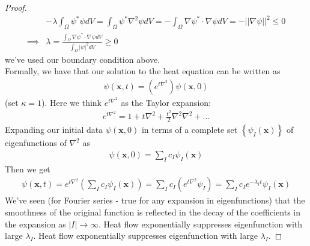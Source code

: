 \documentclass[a4paper]{article}
\begin{document}
\begin{proof}
\begin{equation*}
\begin{aligned}
&-\lambda \int_\Omega \psi^* \psi dV = \int_\Omega \psi^* \nabla^2 \psi dV = -\int_\Omega \nabla\psi^* \cdot \nabla\psi dV = - ||\nabla\psi||^2 \leq 0\\
\implies & \lambda = \frac{\int_\Omega \nabla \psi^* \cdot \nabla \psi dV}{\int_\Omega \left|\psi\right|^2 dV} \geq 0
\end{aligned}
\end{equation*}
we've used our boundary condition above.\\
Formally, we have that our solution to the heat equation can be written as
\begin{equation*}
\begin{aligned}
\psi\left(\mathbf{x},t\right) = \left(e^{t\nabla^2}\right)\psi\left(\mathbf{x},0\right)
\end{aligned}
\end{equation*}
(set $\kappa = 1$). Here we think $e^{t\nabla^2}$ as the Taylor expansion:
\begin{equation*}
\begin{aligned}
e^{t\nabla^2} = 1+t\nabla^2 + \frac{t^2}{2} \nabla^2\nabla^2+...
\end{aligned}
\end{equation*}
Expanding our initial data $\psi\left(\mathbf{x},0\right)$ in terms of a complete set $\left\{\psi_I\left(\mathbf{x}\right)\right\}$ of eigenfunctions of $\nabla^2$ as 
\begin{equation*}
\begin{aligned}
\psi\left(\mathbf{x},0\right) = \sum_I c_I \psi_I \left(\mathbf{x}\right)
\end{aligned}
\end{equation*}
Then we get
\begin{equation*}
\begin{aligned}
\psi\left(\mathbf{x},t\right) = e^{t\nabla^2} \left(\sum_I c_I\psi_I\left(\mathbf{x}\right)\right) = \sum_I c_I \left(e^{t\nabla^2} \psi_I\right) = \sum_I c_I e^{-\lambda_I t} \psi_I\left(\mathbf{x}\right)
\end{aligned}
\end{equation*}
We've seen (for Fourier series - true for any expansion in eigenfunctions) that the smoothness of the original function is reflected in the decay of the coefficients in the expansion as $|I| \to \infty$. Heat flow exponentially suppresses eigenfunction with large $\lambda_I$. Heat flow exponentially suppresses eigenfunction with large $\lambda_I$.
\end{proof}
\end{document}
